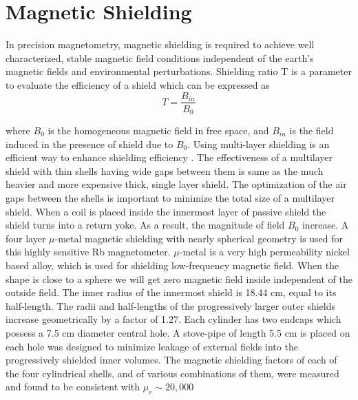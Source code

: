 \section{Magnetic Shielding}
In precision magnetometry, magnetic shielding is required to achieve well characterized, stable magnetic field conditions independent of the earth’s magnetic fields and environmental perturbations. Shielding ratio T is a parameter to evaluate the efficiency of a shield which can be expressed as
\begin{equation}
 T = \frac{B_{in} }{B_0} 
\end{equation}

where $B_0$ is the homogeneous magnetic field in free space, and $B_{in}$ is the field induced in the presence of shield due to  $B_0$. Using multi-layer shielding is an efficient way to enhance shielding efficiency\cite{doe:website2} . The effectiveness of a multilayer shield with thin shells having wide gaps between them is same as the much heavier and more expensive thick, single layer shield.
The optimization of the air gaps between the shells is important to minimize the total size of a multilayer shield. When a coil is placed inside the innermost layer of passive shield the shield turns into a return yoke. As a result, the magnitude of field $B_0$ increase. A four layer $\mu$-metal magnetic shielding with nearly spherical geometry is used for this highly sensitive Rb magnetometer. $\mu$-metal is a very high permeability nickel based alloy, which is used for shielding low-frequency magnetic field. When the shape is close to a sphere we will get zero magnetic field inside independent of the outside field. The inner radius of the innermost shield is 18.44 cm, equal to its half-length. The radii and half-lengths of the progressively larger outer shields increase geometrically by a factor of 1.27. Each cylinder has two endcaps which possess a 7.5 cm diameter central hole\cite{Andalib:2016ahj}. A stove-pipe of length 5.5 cm is placed on each hole was designed to minimize leakage of external fields into the progressively shielded inner volumes. The magnetic shielding factors of each of the four cylindrical shells, and of various combinations of them, were measured and found to be consistent with $\mu_r \sim 20, 000$\cite{Martin:2014foa}
